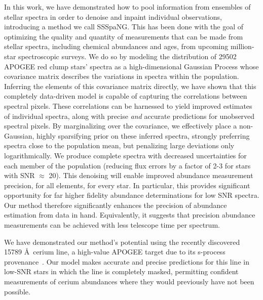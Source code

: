 \documentclass[a4paper,fleqn,usenatbib]{mnras}
\begin{document}
In this work, we have demonstrated how to pool information from ensembles of stellar spectra in order to denoise and inpaint individual observations, introducing a method we call SSSpaNG. This has been done with the goal of optimizing the quality and quantity of measurements that can be made from stellar spectra, including chemical abundances and ages, from upcoming million-star spectroscopic surveys. We do so by modeling the distribution of 29502 APOGEE red clump stars' spectra as a high-dimensional Gaussian Process whose covariance matrix describes the variations in spectra within the population. Inferring the elements of this covariance matrix directly, we have shown that this completely data-driven model is capable of capturing the correlations between spectral pixels. These correlations can be harnessed to yield improved estimates of individual spectra, along with precise {\it and} accurate predictions for unobserved spectral pixels. By marginalizing over the covariance, we effectively place a non-Gaussian, highly sparsifying prior on these inferred spectra, strongly preferring spectra close to the population mean, but penalizing large deviations only logarithmically. We produce complete spectra with decreased uncertainties for each member of the population (reducing flux errors by a factor of 2-3 for stars with SNR $\approx$ 20). This denoising will enable improved abundance measurement precision, for all elements, for every star. In particular, this provides significant opportunity for far higher fidelity abundance determinations for low SNR spectra. Our method therefore significantly enhances the precision of abundance estimation from data in hand. Equivalently, it suggests that precision abundance measurements can be achieved with less telescope time per spectrum.

We have demonstrated our method's potential using the recently discovered 15789 \AA\ cerium line, a high-value APOGEE target due to its s-process provenance~\citep{Cunha2017}. Our model makes accurate and precise predictions for this line in low-SNR stars in which the line is completely masked, permitting confident measurements of cerium abundances where they would previously have not been possible.
\end{document}
